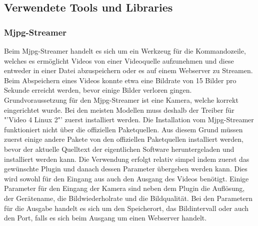 \subsection{Verwendete Tools und Libraries}
\subsubsection{Mjpg-Streamer}
Beim Mjpg-Streamer handelt es sich um ein Werkzeug für die Kommandozeile, welches es ermöglicht Videos von einer Videoquelle aufzunehmen und diese entweder in einer Datei abzuspeichern oder es auf einem Webserver zu Streamen. Beim Abspeichern eines Videos konnte etwa eine Bildrate von 15 Bilder pro Sekunde erreicht werden, bevor einige Bilder verloren gingen. \\
Grundvoraussetzung für den Mjpg-Streamer ist eine Kamera, welche korrekt eingerichtet wurde. Bei den meisten Modellen muss deshalb der Treiber für "'Video 4 Linux 2"' zuerst installiert werden. Die Installation vom Mjpg-Streamer funktioniert nicht über die offiziellen Paketquellen. Aus diesem Grund müssen zuerst einige andere Pakete von den offiziellen Paketquellen installiert werden, bevor der aktuelle Quelltext der eigentlichen Software heruntergeladen und installiert werden kann. Die Verwendung erfolgt relativ simpel indem zuerst das gewünschte Plugin und danach dessen Parameter übergeben werden kann. Dies wird sowohl für den Eingang aus auch den Ausgang des Videos benötigt. Einige Parameter für den Eingang der Kamera sind neben dem Plugin die Auflösung, der Gerätename, die Bildwiederholrate und die Bildqualität. Bei den Parametern für die Ausgabe handelt es sich um den Speicherort, das Bildintervall oder auch den Port, falls es sich beim Ausgang um einen Webserver handelt. \cite{MjpgStreamer}

